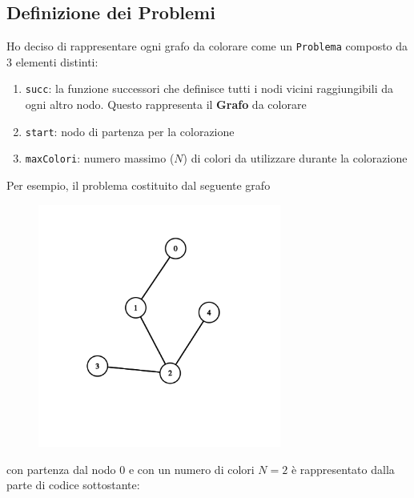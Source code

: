 \documentclass[11pt]{article}
\providecommand{\tightlist}{%
      \setlength{\itemsep}{0pt}\setlength{\parskip}{0pt}}
\begin{document}
\newpage


\subsection{\texorpdfstring{Definizione dei Problemi
}{Definizione dei Problemi }}\label{definizione-dei-problemi}

    Ho deciso di rappresentare ogni grafo da colorare come un
\texttt{Problema} composto da 3 elementi distinti:

\begin{enumerate}
\def\labelenumi{\arabic{enumi}.}
\tightlist
\item
  \texttt{succ}: la funzione successori che definisce tutti i nodi
  vicini raggiungibili da ogni altro nodo. Questo rappresenta il
  \textbf{Grafo} da colorare
\item
  \texttt{start}: nodo di partenza per la colorazione
\item
  \texttt{maxColori}: numero massimo (\(N\)) di colori da utilizzare
  durante la colorazione
\end{enumerate}

    Per esempio, il problema costituito dal seguente grafo
    \begin{figure}[H]
        \centering
        \includegraphics[width=8cm, keepaspectratio]{Colored Camel_files/graph7.png}
    \end{figure}
 con partenza dal nodo \(0\) e
con un numero di colori \(N=2\) è rappresentato dalla parte di codice
sottostante:
\end{document}

